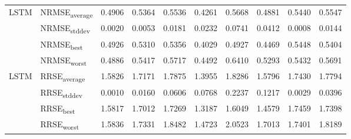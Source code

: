 {\begin{longtable}{l l c c c c c c c c}
\cmidrule(lr){2-10}
\multirow{4}{*}{LSTM} & NRMSE\textsubscript{average} & 0.4906 & 0.5364 & 0.5536 & 0.4261 & 0.5668 & 0.4881 & 0.5440 & 0.5547 \\
 & NRMSE\textsubscript{stddev} & 0.0020 & 0.0053 & 0.0181 & 0.0232 & 0.0741 & 0.0412 & 0.0008 & 0.0144 \\
 & NRMSE\textsubscript{best} & 0.4926 & 0.5310 & 0.5356 & 0.4029 & 0.4927 & 0.4469 & 0.5448 & 0.5404 \\
 & NRMSE\textsubscript{worst} & 0.4886 & 0.5417 & 0.5717 & 0.4492 & 0.6410 & 0.5293 & 0.5432 & 0.5691 \\
\cmidrule(lr){2-10}
\multirow{4}{*}{LSTM} & RRSE\textsubscript{average} & 1.5826 & 1.7171 & 1.7875 & 1.3955 & 1.8286 & 1.5796 & 1.7430 & 1.7794 \\
 & RRSE\textsubscript{stddev} & 0.0010 & 0.0160 & 0.0606 & 0.0768 & 0.2237 & 0.1217 & 0.0029 & 0.0396 \\
 & RRSE\textsubscript{best} & 1.5817 & 1.7012 & 1.7269 & 1.3187 & 1.6049 & 1.4579 & 1.7459 & 1.7398 \\
 & RRSE\textsubscript{worst} & 1.5836 & 1.7331 & 1.8482 & 1.4723 & 2.0523 & 1.7013 & 1.7401 & 1.8189 \\
\cmidrule(lr){2-10}
\end{longtable}
}